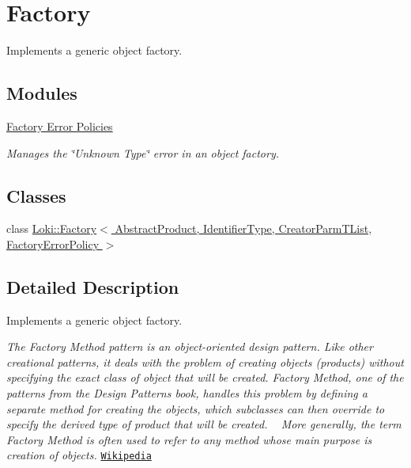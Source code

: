\hypertarget{group__FactoryGroup}{}\section{Factory}
\label{group__FactoryGroup}


Implements a generic object factory.  


\subsection*{Modules}
\begin{DoxyCompactItemize}
\item 
\hyperlink{group__FactoryErrorPoliciesGroup}{Factory Error Policies}
\begin{DoxyCompactList}\small\item\em Manages the \char`\"{}\+Unknown Type\char`\"{} error in an object factory. \end{DoxyCompactList}\end{DoxyCompactItemize}
\subsection*{Classes}
\begin{DoxyCompactItemize}
\item 
class \hyperlink{classLoki_1_1Factory}{Loki\+::\+Factory$<$ Abstract\+Product, Identifier\+Type, Creator\+Parm\+T\+List, Factory\+Error\+Policy $>$}
\end{DoxyCompactItemize}


\subsection{Detailed Description}
Implements a generic object factory. 

{\itshape The Factory Method pattern is an object-\/oriented design pattern. Like other creational patterns, it deals with the problem of creating objects (products) without specifying the exact class of object that will be created. Factory Method, one of the patterns from the Design Patterns book, handles this problem by defining a separate method for creating the objects, which subclasses can then override to specify the derived type of product that will be created. ~\newline
 More generally, the term Factory Method is often used to refer to any method whose main purpose is creation of objects.} \href{http://en.wikipedia.org/wiki/Factory_method_pattern}{\tt Wikipedia}

